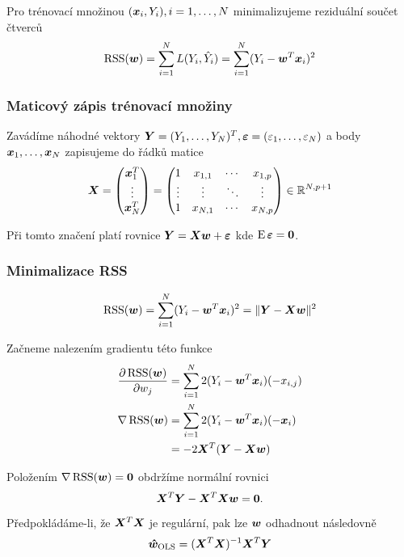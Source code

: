Pro trénovací množinou $(\bm{x}_i, Y_i), i = 1, \ldots, N$ minimalizujeme reziduální součet čtverců
\[ \operatorname{RSS}(\bm{w}) = \sum_{i = 1}^{N} L(Y_i, \hat{Y}_i) = \sum_{i = 1}^{N} (Y_i - \bm{w}^T \bm{x}_i)^2 \]

\subsubsection{Maticový zápis trénovací množiny}

Zavádíme náhodné vektory $\bm{Y} = (Y_1, \ldots, Y_N)^T, \bm{\varepsilon} = (\varepsilon_1, \ldots, \varepsilon_N)$ a body $\bm{x}_1, \ldots, \bm{x}_N$ zapisujeme do řádků matice
\begin{equation*}
    \bm{X} =
    \begin{pmatrix}
        \bm{x}_1^T \\
        \vdots \\
        \bm{x}_N^T
    \end{pmatrix}
    =
    \begin{pmatrix}
        1      & x_{1,1} & \cdots & x_{1,p} \\
        \vdots & \vdots  & \ddots & \vdots  \\
        1      & x_{N,1} & \cdots & x_{N,p} \\
    \end{pmatrix}
    \in \mathbb{R}^{N, p+1}
\end{equation*}

Při tomto značení platí rovnice $\bm{Y} = \bm{X}\bm{w} + \bm{\varepsilon}$ kde $\operatorname{E} \bm{\varepsilon} = \mathbf{0}$.

\subsubsection{Minimalizace RSS}

\[ \operatorname{RSS}(\bm{w}) = \sum_{i=1}^{N} (Y_i - \bm{w}^T \bm{x}_i)^2  = \| \bm{Y} - \bm{X} \bm{w} \|^2 \]

Začneme nalezením gradientu této funkce
\begin{align*}
    \pdv{\operatorname{RSS}(\bm{w})}{w_j}
     & = \sum_{i=1}^{N} 2 (Y_i - \bm{w}^T \bm{x}_i) (-x_{i, j}) \\
    \nabla \operatorname{RSS}(\bm{w})
     & = \sum_{i=1}^{N} 2 (Y_i - \bm{w}^T \bm{x}_i) (-\bm{x}_i)     \\
     & = -2 \bm{X}^T (\bm{Y} - \bm{X}\bm{w})
\end{align*}

Položením $\nabla \operatorname{RSS}(\bm{w}) = \mathbf{0}$ obdržíme normální rovnici
\[ \bm{X}^T \bm{Y} - \bm{X}^T \bm{X}\bm{w} = \mathbf{0}. \]

Předpokládáme-li, že $\bm{X}^T\bm{X}$ je regulární, pak lze $\bm{w}$ odhadnout následovně
\[ \bm{\hat{w}}_{\text{OLS}} = (\bm{X}^T \bm{X})^{-1} \bm{X}^T \bm{Y} \]


